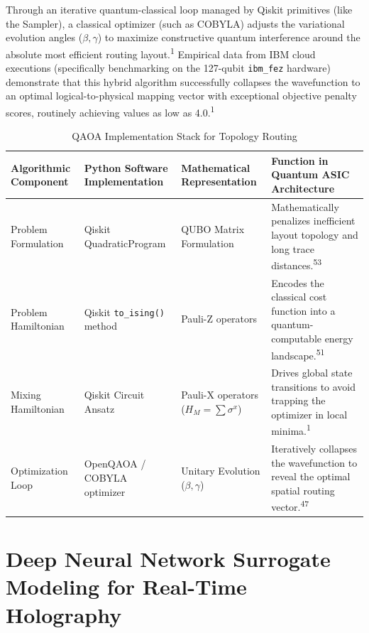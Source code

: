 \documentclass[11pt, a4paper]{article}
\begin{document}
Through an iterative quantum-classical loop managed by Qiskit primitives (like the Sampler), a classical optimizer (such as COBYLA) adjusts the variational evolution angles ($\beta, \gamma$) to maximize constructive quantum interference around the absolute most efficient routing layout.\textsuperscript{1} Empirical data from IBM cloud executions (specifically benchmarking on the 127-qubit \texttt{ibm\_fez} hardware) demonstrate that this hybrid algorithm successfully collapses the wavefunction to an optimal logical-to-physical mapping vector with exceptional objective penalty scores, routinely achieving values as low as 4.0.\textsuperscript{1}

\begin{table}[htbp]
\centering
\renewcommand{\arraystretch}{1.5}
\begin{tabularx}{\textwidth}{>{\raggedright\arraybackslash}p{3cm} >{\raggedright\arraybackslash}X >{\raggedright\arraybackslash}X >{\raggedright\arraybackslash}X}
\toprule
\textbf{Algorithmic Component} & \textbf{Python Software Implementation} & \textbf{Mathematical Representation} & \textbf{Function in Quantum ASIC Architecture} \\
\midrule
Problem Formulation & Qiskit QuadraticProgram & QUBO Matrix Formulation & Mathematically penalizes inefficient layout topology and long trace distances.\textsuperscript{53} \\
Problem Hamiltonian & Qiskit \texttt{to\_ising()} method & Pauli-Z operators & Encodes the classical cost function into a quantum-computable energy landscape.\textsuperscript{51} \\
Mixing Hamiltonian & Qiskit Circuit Ansatz & Pauli-X operators ($H_M = \sum \sigma^x$) & Drives global state transitions to avoid trapping the optimizer in local minima.\textsuperscript{1} \\
Optimization Loop & OpenQAOA / COBYLA optimizer & Unitary Evolution ($\beta, \gamma$) & Iteratively collapses the wavefunction to reveal the optimal spatial routing vector.\textsuperscript{47} \\
\bottomrule
\end{tabularx}
\caption{QAOA Implementation Stack for Topology Routing}
\end{table}

\section{Deep Neural Network Surrogate Modeling for Real-Time Holography}
\end{document}
